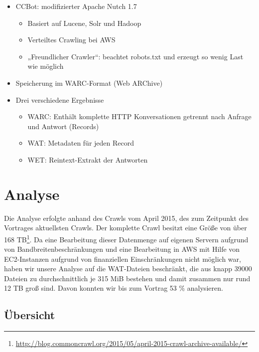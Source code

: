 \documentclass[a4paper,12pt,titlepage=false]{scrreprt}
\begin{document}
\begin{itemize}
    \item CCBot: modifizierter Apache Nutch 1.7
        \begin{itemize}
            \item Basiert auf Lucene, Solr und Hadoop
            \item Verteiltes Crawling bei AWS
            \item „Freundlicher Crawler“: beachtet robots.txt und erzeugt so wenig Last wie möglich
        \end{itemize}
    \item Speicherung im WARC-Format (Web ARChive)
    \item Drei verschiedene Ergebnisse
        \begin{itemize}
            \item WARC: Enthält komplette HTTP Konversationen getrennt nach
                Anfrage und Antwort (Records)
            \item WAT: Metadaten für jeden Record
            \item WET: Reintext-Extrakt der Antworten
        \end{itemize}
\end{itemize}


\chapter{Analyse}

Die Analyse erfolgte anhand des Crawls vom April 2015, des zum Zeitpunkt des
Vortrages aktuellsten Crawls. Der komplette Crawl besitzt eine Größe von über
168 TB\footnote{\url{http://blog.commoncrawl.org/2015/05/april-2015-crawl-archive-available/}}.
Da eine Bearbeitung dieser Datenmenge auf eigenen Servern aufgrund von
Bandbreitenbeschränkungen und eine Bearbeitung in AWS mit Hilfe von EC2-Instanzen
aufgrund von finanziellen Einschränkungen nicht möglich war, haben wir unsere
Analyse auf die WAT-Dateien beschränkt, die aus knapp 39000 Dateien zu
durchschnittlich je 315 MiB bestehen und damit zusammen nur rund 12 TB groß sind.
Davon konnten wir bis zum Vortrag 53 \% analysieren.

\section{Übersicht}

\begin{figure}
\label{wrap-fig:1}
\end{figure}
\end{document}

